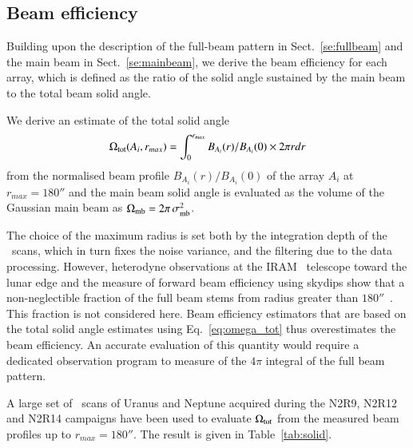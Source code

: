 \subsection{Beam efficiency}
\label{se:beam_efficiency}

Building upon the description of the full-beam pattern in
Sect.~\ref{se:fullbeam} and the main beam in Sect.~\ref{se:mainbeam},
we derive the beam efficiency for each array, which is defined as the
ratio of the solid angle sustained by the main beam to the total beam
solid angle.

We derive an estimate of the total solid angle
\begin{equation}
  \Omega_{\rm{tot}} (A_i, r_{max}) = \int_0^{r_{max}} B_{A_i}(r)/B_{A_i}(0) \times 2 \pi r dr
  \label{eq:omega_tot}
\end{equation}
from the normalised beam profile $B_{A_i}(r)/B_{A_i}(0)$ of the array
$A_i$  at $r_{max} = 180''$ and the main beam solid angle is
evaluated as the volume of the Gaussian main beam as
$\Omega_{\rm{mb}} = 2 \pi\,  \sigma_{\rm{mb}}^2$.

The choice of the maximum radius is set both by the integration depth of
the \bm\ scans, which in turn fixes the noise variance, and the
filtering due to the data processing.
However, heterodyne observations at the IRAM \trentemetre\ telescope
toward the lunar edge and the measure of forward beam efficiency using
skydips show that a non-neglectible fraction of the full beam stems
from radius greater than $180''$~\citep{Greve2010, Kramer2013}. This
fraction is not considered here. Beam efficiency estimators that are based on
the total solid angle estimates using Eq.~\ref{eq:omega_tot} thus
overestimates the beam efficiency. An accurate evaluation of
this quantity would require a dedicated observation program to measure
of the $4\pi$ integral of the full beam pattern.


A large set of \bm\ scans of Uranus and Neptune acquired during the
N2R9, N2R12 and N2R14 campaigns have been used to evaluate
$\Omega_{\rm{tot}}$ from the measured beam profiles up to
$r_{max} =180''$. %
The result is given in Table~\ref{tab:solid}.

